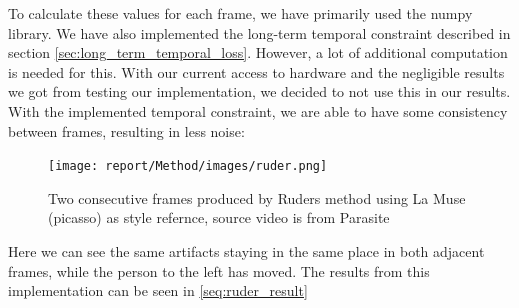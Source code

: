 \newline
To calculate these values for each frame, we have primarily used the numpy library. We have also implemented the long-term temporal constraint described in section \ref{sec:long_term_temporal_loss}. However, a lot of additional computation is needed for this. With our current access to hardware and the negligible results we got from testing our implementation, we decided to not use this in our results.\newline\newline
With the implemented temporal constraint, we are able to have some consistency between frames, resulting in less noise: \newline
\begin{figure}[!ht]
\begin{center}
\texttt{[image: report/Method/images/ruder.png]}
\caption{Two consecutive frames produced by Ruders method using La Muse (picasso) as style refernce, source video is from Parasite}
\label{fig:architecture}
\end{center}
\end{figure}Here we can see the same artifacts staying in the same place in both adjacent frames, while the person to the left has moved. The results from this implementation can be seen in \ref{seq:ruder_result}